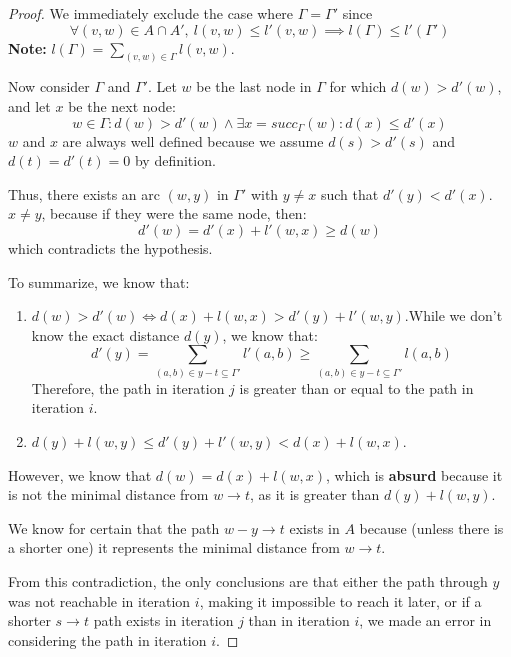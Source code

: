 \begin{proof}
            We immediately exclude the case where \( \Gamma = \Gamma' \) since
            \[
            \forall (v,w) \in A \cap A',\ l(v,w) \le l'(v,w) \implies l(\Gamma) \le l'(\Gamma')
            \]
            \textbf{Note:} \( l(\Gamma) = \sum_{(v,w) \in \Gamma} l(v,w) \).

            Now consider \( \Gamma \) and \( \Gamma' \). Let \( w \) be the last node in \( \Gamma \) for which \( d(w) > d'(w) \), and let \( x \) be the next node:
            \[
            w \in \Gamma : d(w) > d'(w) \land \exists x = succ_{\Gamma}(w) : d(x) \le d'(x)
            \]
            \( w \) and \( x \) are always well defined because we assume \( d(s) > d'(s) \) and \( d(t) = d'(t) = 0 \) by definition.

            Thus, there exists an arc \( (w,y) \) in \( \Gamma' \) with \( y \neq x \) such that \( d'(y) < d'(x) \). \( x \neq y \), because if they were the same node, then:
            \[
            d'(w) = d'(x) + l'(w,x) \ge d(w)
            \]
            which contradicts the hypothesis.

            To summarize, we know that:
            \begin{enumerate}
                \item \( d(w) > d'(w) \iff d(x) + l(w,x) > d'(y) + l'(w,y) \).While we don't know the exact distance \( d(y) \), we know that:
            \[
            d'(y) = \sum_{(a,b) \in y-t \subseteq \Gamma'} l'(a,b) \ge \sum_{(a,b) \in y-t \subseteq \Gamma'} l(a,b)
            \]
            Therefore, the path in iteration \( j \) is greater than or equal to the path in iteration \( i \).
                \item \( d(y) + l(w,y) \le d'(y) + l'(w,y) < d(x) + l(w,x) \).
            \end{enumerate}

            However, we know that \( d(w) = d(x) + l(w,x) \), which is \textbf{absurd} because it is not the minimal distance from \( w \rightarrow t \), as it is greater than \( d(y) + l(w,y) \).

            We know for certain that the path \( w-y \rightarrow t \) exists in \( A \) because (unless there is a shorter one) it represents the minimal distance from \( w \rightarrow t \).

            From this contradiction, the only conclusions are that either the path through \( y \) was not reachable in iteration \( i \), making it impossible to reach it later, or if a shorter \( s \rightarrow t \) path exists in iteration \( j \) than in iteration \( i \), we made an error in considering the path in iteration \( i \).


\end{proof}
